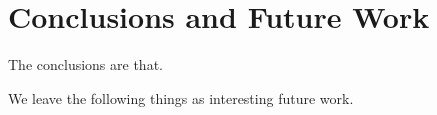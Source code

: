 \section{Conclusions and Future Work}%
\label{sec:kappa:conclusions}

The conclusions are that.

We leave the following things as interesting future work.